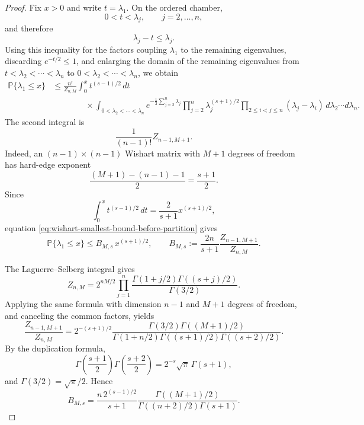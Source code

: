 \documentclass[11pt]{article}
\newcommand{\Pbb}{\mathbb P}
\newcommand{\1}{\mathbf 1}
\begin{document}
\begin{proof}
Fix \(x>0\) and write \(t=\lambda_1\).  On the ordered chamber,
\[
        0<t<\lambda_j,
        \qquad j=2,\ldots,n,
\]
and therefore
\[
        \lambda_j-t\le\lambda_j.
\]
Using this inequality for the factors coupling \(\lambda_1\) to the remaining eigenvalues,
discarding \(e^{-t/2}\le1\), and enlarging the domain of the remaining eigenvalues from
\(t<\lambda_2<\cdots<\lambda_n\) to
\(0<\lambda_2<\cdots<\lambda_n\), we obtain
\begin{align}
        \Pbb\{\lambda_1\le x\}
        &\le
        \frac{n!}{Z_{n,M}}
        \int_0^x t^{(s-1)/2}\,dt
\nonumber\\
        &\qquad\qquad\times
        \int_{0<\lambda_2<\cdots<\lambda_n}
        e^{-\frac12\sum_{j=2}^n\lambda_j}
        \prod_{j=2}^n\lambda_j^{(s+1)/2}
        \prod_{2\le i<j\le n}(\lambda_j-\lambda_i)
        \,d\lambda_2\cdots d\lambda_n.
        \label{eq:wishart-smallest-bound-before-partition}
\end{align}
The second integral is
\[
        \frac{1}{(n-1)!}Z_{n-1,M+1}.
\]
Indeed, an \((n-1)\times(n-1)\) Wishart matrix with \(M+1\) degrees of freedom has
hard-edge exponent
\[
        \frac{(M+1)-(n-1)-1}{2}
        =
        \frac{s+1}{2}.
\]
Since
\[
        \int_0^x t^{(s-1)/2}\,dt
        =
        \frac{2}{s+1}x^{(s+1)/2},
\]
equation \eqref{eq:wishart-smallest-bound-before-partition} gives
\begin{equation}
        \Pbb\{\lambda_1\le x\}
        \le
        B_{M,s}\,x^{(s+1)/2},
        \qquad
        B_{M,s}
        :=
        \frac{2n}{s+1}
        \frac{Z_{n-1,M+1}}{Z_{n,M}}.
        \label{eq:wishart-smallest-partition-ratio}
\end{equation}

The Laguerre--Selberg integral gives
\begin{equation}
        Z_{n,M}
        =
        2^{nM/2}
        \prod_{j=1}^n
        \frac{
        \Gamma(1+j/2)\Gamma((s+j)/2)
        }{
        \Gamma(3/2)
        }.
        \label{eq:laguerre-partition-function}
\end{equation}
Applying the same formula with dimension \(n-1\) and \(M+1\) degrees of freedom,
and canceling the common factors, yields
\begin{equation}
        \frac{Z_{n-1,M+1}}{Z_{n,M}}
        =
        2^{-(s+1)/2}
        \frac{
        \Gamma(3/2)\Gamma((M+1)/2)
        }{
        \Gamma(1+n/2)
        \Gamma((s+1)/2)
        \Gamma((s+2)/2)
        }.
        \label{eq:laguerre-partition-ratio}
\end{equation}
By the duplication formula,
\[
        \Gamma\left(\frac{s+1}{2}\right)
        \Gamma\left(\frac{s+2}{2}\right)
        =
        2^{-s}\sqrt{\pi}\,\Gamma(s+1),
\]
and \(\Gamma(3/2)=\sqrt{\pi}/2\).  Hence
\begin{equation}
        B_{M,s}
        =
        \frac{n\,2^{(s-1)/2}}{s+1}
        \frac{
        \Gamma((M+1)/2)
        }{
        \Gamma((n+2)/2)\Gamma(s+1)
        }.
        \label{eq:BMs-explicit}
\end{equation}


\end{proof}
\end{document}
